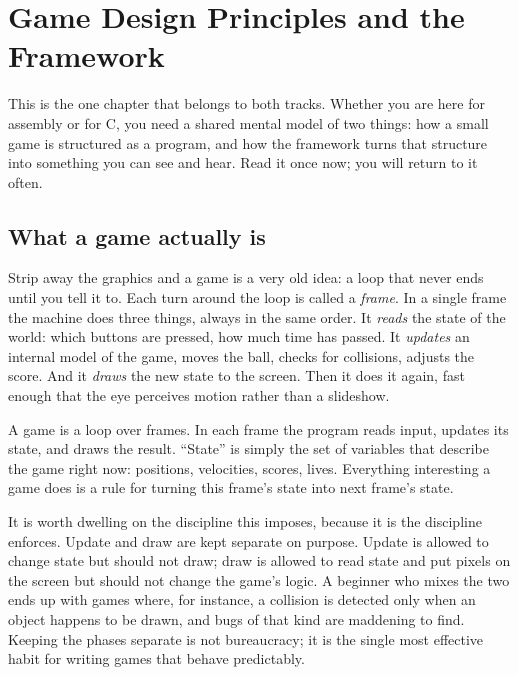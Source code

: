 \chapter{Game Design Principles and the \prg Framework}
\label{ch:platform}

This is the one chapter that belongs to both tracks. Whether you are here for
assembly or for C, you need a shared mental model of two things: how a small game
is structured as a program, and how the \prg framework turns that structure into
something you can see and hear. Read it once now; you will return to it often.

\section{What a game actually is}

Strip away the graphics and a game is a very old idea: a loop that never ends
until you tell it to. Each turn around the loop is called a \emph{frame}. In a
single frame the machine does three things, always in the same order. It
\emph{reads} the state of the world: which buttons are pressed, how much time has
passed. It \emph{updates} an internal model of the game, moves the ball, checks
for collisions, adjusts the score. And it \emph{draws} the new state to the
screen. Then it does it again, fast enough that the eye perceives motion rather
than a slideshow.

\begin{prgconcept}
A game is a loop over frames. In each frame the program reads input, updates its
state, and draws the result. ``State'' is simply the set of variables that
describe the game right now: positions, velocities, scores, lives. Everything
interesting a game does is a rule for turning this frame's state into next
frame's state.
\end{prgconcept}

It is worth dwelling on the discipline this imposes, because it is the discipline
\prg enforces. Update and draw are kept separate on purpose. Update is allowed to
change state but should not draw; draw is allowed to read state and put pixels on
the screen but should not change the game's logic. A beginner who mixes the two
ends up with games where, for instance, a collision is detected only when an
object happens to be drawn, and bugs of that kind are maddening to find. Keeping
the phases separate is not bureaucracy; it is the single most effective habit for
writing games that behave predictably.

